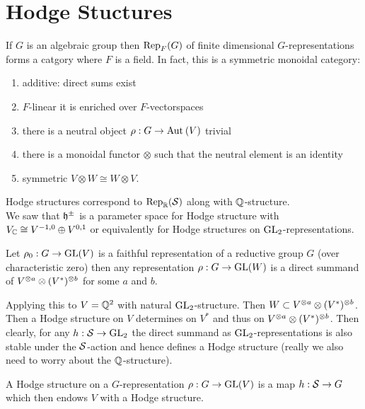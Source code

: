 \documentclass[12pt]{article}
\begin{document}
\section{Hodge Stuctures}

If $G$ is an algebraic group then $\Rep_F(G)$ of finite dimensional $G$-representations forms a catgory where $F$ is a field. In fact, this is a symmetric monoidal category:

\begin{enumerate}
\item additive: direct sums exist
\item $F$-linear it is enriched over $F$-vectorspaces
\item there is a neutral object $\rho : G \to \Aut{V}$ trivial
\item there is a monoidal functor $\otimes$ such that the neutral element is an identity
\item symmetric $V \otimes W \cong W \otimes V$. 
\end{enumerate}

Hodge structures correspond to $\Rep_{\RR}(\S)$ along with $\Q$-structure.
\bigskip\\
We saw that $\h^{\pm}$ is a parameter space for Hodge structure with $V_{\CC} \cong V^{-1,0} \oplus V^{0,1}$ or equivalently for Hodge structures on $\GL_2$-representations. 

\begin{theorem}
Let $\rho_0 : G \to \GL(V)$ is a faithful representation of a reductive group $G$ (over characteristic zero) then any representation $\rho : G \to \GL(W)$ is a direct summand of $V^{\ot a} \ot (V^*)^{\ot b}$ for some $a$ and $b$. 
\end{theorem}

\begin{rmk}
Applying this to $V = \Q^2$ with natural $\GL_2$-structure. Then $W \subset V^{\ot a} \ot (V^*)^{\ot b}$. Then a Hodge structure on $V$ determines on $V^*$ and thus on $V^{\ot a} \ot (V^*)^{\ot b}$. Then clearly, for any $h : \S \to \GL_2$ the direct summand as $\GL_2$-representations is also stable under the $\S$-action and hence defines a Hodge structure (really we also need to worry about the $\Q$-structure).  
\end{rmk}

\begin{defn}
A Hodge structure on a $G$-representation $\rho : G \to \GL(V)$ is a map $h : \S \to G$ which then endows $V$ with a Hodge structure. 
\end{defn}
\end{document}
